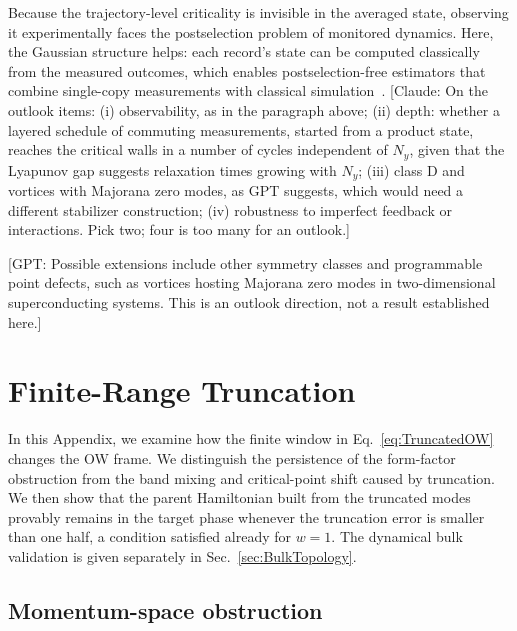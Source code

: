\documentclass[aps,prb,10pt,twocolumn,superscriptaddress,longbibliography,floatfix]{revtex4-2}
\newcommand{\GPT}[1]{{\color{magenta}[GPT: #1]}}
\newcommand{\claudeadd}[1]{{\color{orange}#1}}
\newcommand{\claudecom}[1]{{\color{ForestGreen}[Claude: #1]}}
\begin{document}
\claudeadd{Because the trajectory-level criticality is invisible in the averaged state, observing it experimentally faces the postselection problem of monitored dynamics. Here, the Gaussian structure helps: each record's state can be computed classically from the measured outcomes, which enables postselection-free estimators that combine single-copy measurements with classical simulation~\cite{GarrattAltman2024,McGinley2024}.}
\claudecom{On the outlook items: (i) observability, as in the paragraph above; (ii) depth: whether a layered schedule of commuting measurements, started from a product state, reaches the critical walls in a number of cycles independent of $N_y$, given that the Lyapunov gap suggests relaxation times growing with $N_y$; (iii) class D and vortices with Majorana zero modes, as GPT suggests, which would need a different stabilizer construction; (iv) robustness to imperfect feedback or interactions. Pick two; four is too many for an outlook.}

\GPT{Possible extensions include other symmetry classes and programmable point defects, such as vortices hosting Majorana zero modes in two-dimensional superconducting systems. This is an outlook direction, not a result established here.}


\FloatBarrier
\appendix
\setcounter{figure}{0}
\renewcommand{\thefigure}{A\arabic{figure}}
\renewcommand{\theHfigure}{A\arabic{figure}}

{\color{blue}\section{Finite-Range Truncation}
\label{app:Truncation}}

{\color{blue}
In this Appendix, we examine how the finite window in Eq.~\eqref{eq:TruncatedOW} changes the OW frame. We distinguish the persistence of the form-factor obstruction from the band mixing and critical-point shift caused by truncation. \claudeadd{We then show that the parent Hamiltonian built from the truncated modes provably remains in the target phase whenever the truncation error is smaller than one half, a condition satisfied already for $w=1$.} The dynamical bulk validation is given separately in Sec.~\ref{sec:BulkTopology}.
}

\subsection{Momentum-space obstruction}
\end{document}
